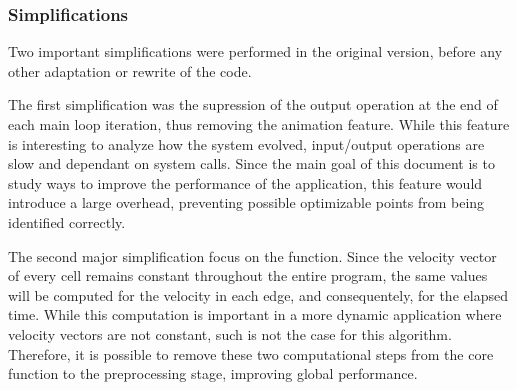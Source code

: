 \subsubsection{Simplifications}

Two important simplifications were performed in the original version, before any other adaptation or rewrite of the code.

The first simplification was the supression of the output operation at the end of each main loop iteration, thus removing the animation feature. While this feature is interesting to analyze how the system evolved, input/output operations are slow and dependant on system calls. Since the main goal of this document is to study ways to improve the performance of the \polu application, this feature would introduce a large overhead, preventing possible optimizable points from being identified correctly.

The second major simplification focus on the \computeflux function. Since the velocity vector of every cell remains constant throughout the entire program, the same values will be computed for the velocity in each edge, and consequentely, for the elapsed time. While this computation is important in a more dynamic application where velocity vectors are not constant, such is not the case for this algorithm. Therefore, it is possible to remove these two computational steps from the core function to the preprocessing stage, improving global performance.
